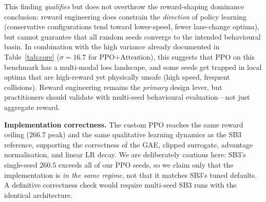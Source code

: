 \documentclass[conference]{IEEEtran}
\begin{document}
This finding \emph{qualifies} but does not overthrow the reward-shaping
dominance conclusion: reward engineering does constrain the \emph{direction}
of policy learning (conservative configurations tend toward lower-speed, fewer
lane-change optima), but cannot guarantee that all random seeds converge to the
intended behavioural basin. In combination with the high variance already
documented in Table~\ref{tab:core} ($\sigma=16.7$ for PPO+Attention), this
suggests that PPO on this benchmark has a multi-modal loss landscape, and some
seeds get trapped in local optima that are high-reward yet physically unsafe
(high speed, frequent collisions). Reward
engineering remains the \emph{primary} design lever, but practitioners should
validate with multi-seed behavioural evaluation---not just aggregate reward.

\textbf{Implementation correctness.} The custom PPO reaches the same reward
ceiling ($266.7$ peak) and the same qualitative learning dynamics as the SB3
reference, supporting the correctness of the GAE, clipped surrogate, advantage
normalisation, and linear LR decay. We are deliberately cautious here: SB3's
single-seed $260.5$ exceeds all of our PPO seeds, so we claim only that the
implementation is \emph{in the same regime}, not that it matches SB3's tuned
defaults. A definitive correctness check would require multi-seed SB3 runs with
the identical architecture.
\end{document}
